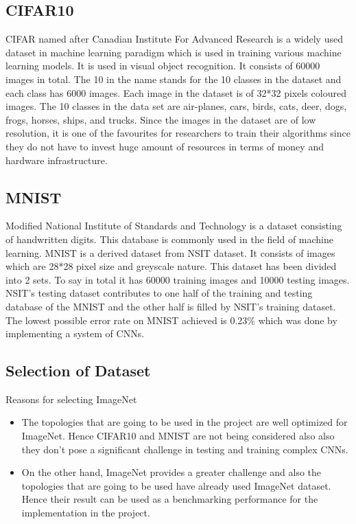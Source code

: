 \documentclass[titlepage]{report}
\begin{document}
\subsection{CIFAR10}
CIFAR named after Canadian Institute For Advanced Research is a widely used dataset in machine learning paradigm which is used in training various machine learning models. It is used in visual object recognition. It consists of 60000 images in total. The 10 in the name stands for the 10 classes in the dataset and each class has 6000 images. Each image in the dataset is of 32*32 pixels coloured images. The 10 classes in the data set are air-planes, cars, birds, cats, deer, dogs, frogs, horses, ships, and trucks. Since the images in the dataset are of low resolution, it is one of the favourites for researchers to train their algorithms since they do not have to invest huge amount of resources in terms of money and hardware infrastructure. 

\subsection{MNIST}
Modified National Institute of Standards and Technology is a dataset consisting of handwritten digits. This database is commonly used in the field of machine learning. MNIST is a derived dataset from NSIT dataset. It consists of images which are 28*28 pixel size and greyscale nature. This dataset has been divided into 2 sets. To say in total it has 60000 training images and 10000 testing images. NSIT's testing dataset contributes to one half of the training and testing database of the MNIST and the other half is filled by NSIT's training dataset. The lowest possible error rate on MNIST achieved is 0.23\%
which was done by implementing a system of CNNs.

\subsection{Selection of Dataset}
Reasons for selecting ImageNet
\begin{itemize}
    \item The topologies that are going to be used in the project are well optimized for ImageNet. Hence CIFAR10 and MNIST are not being considered also also they don't pose a significant challenge in testing and training complex CNNs.
    \item On the other hand, ImageNet provides a greater challenge and also the topologies that are going to be used have already used ImageNet dataset. Hence their result can be used as a benchmarking performance for the implementation in the project.
\end{itemize}
\end{document}
